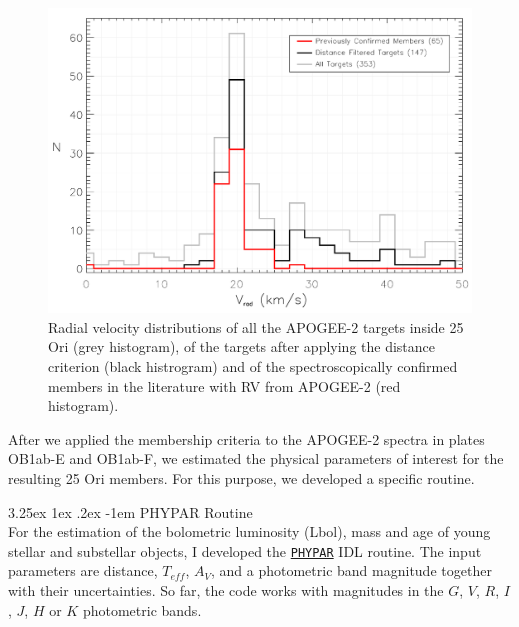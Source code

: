 \documentclass[12pt]{article}
\makeatletter
\newcounter{subsubsubsection}[subsubsection]
\renewcommand\paragraph{\@startsection{paragraph}{5}{\z@}%
  {3.25ex \@plus1ex \@minus.2ex}%
  {-1em}%
  {\normalfont\normalsize\bfseries}}
\makeatother
\begin{document}
\begin{figure}%
	\centering
	\includegraphics[width=1.\textwidth]{radial_velocity.pdf}
	\caption[Radial velocity distributions of the APOGEE-2 targets and members of 25 Ori.]{Radial velocity distributions of all the APOGEE-2 targets inside 25 Ori (grey histogram), of the targets after applying the distance criterion (black histrogram) and of the spectroscopically confirmed members in the literature with RV from APOGEE-2 (red histogram).}
	\label{fig_APOGEE-2:rv}
\end{figure}

\label{sec_APOGEE-2:physical_parameters}
After we applied the membership criteria to the APOGEE-2 spectra in plates OB1ab-E and OB1ab-F, we estimated the physical parameters of interest for the resulting 25 Ori members. For this purpose, we developed a specific routine.

\paragraph{PHYPAR Routine\\}
\label{sec_APOGEE-2:phypar}
For the estimation of the bolometric luminosity (\ac{Lbol}), mass and age of young stellar and substellar objects, I developed the {\href{https://drive.google.com/open?id=1uNv7nxVas2F0TOz3q5aJsKD8yVd4FwqG}{\texttt{PHYPAR}}} IDL routine. The input parameters are distance, $T_{eff}$, $A_V$, and a photometric band magnitude together with their uncertainties. So far, the code works with magnitudes in the $G$, $V$, $R$, $I$, $J$, $H$ or $K$ photometric bands.
\end{document}
